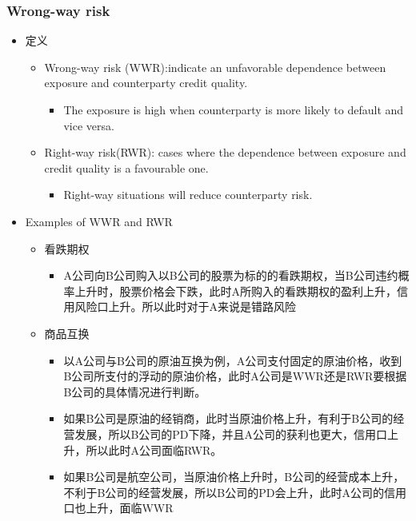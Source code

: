 \subsubsection{Wrong-way risk}
\begin{itemize}
    \item 定义
    \begin{itemize}
        \item Wrong-way risk (WWR):indicate an unfavorable dependence between exposure and counterparty credit quality.
        \begin{itemize}
            \item The exposure is high when counterparty is more likely to default and vice versa.
        \end{itemize}
        
        \item Right-way risk(RWR): cases where the dependence between exposure and credit quality is a favourable one.
        \begin{itemize}
            \item Right-way situations will reduce counterparty risk.
        \end{itemize}
    \end{itemize}
    \item Examples of WWR and RWR
    \begin{itemize}
        \item 看跌期权
        \begin{itemize}
            \item A公司向B公司购入以B公司的股票为标的的看跌期权，当B公司违约概率上升时，股票价格会下跌，此时A所购入的看跌期权的盈利上升，信用风险口上升。所以此时对于A来说是错路风险
        \end{itemize}

        \item 商品互换
        \begin{itemize}
            \item 以A公司与B公司的原油互换为例，A公司支付固定的原油价格，收到B公司所支付的浮动的原油价格，此时A公司是WWR还是RWR要根据B公司的具体情况进行判断。
            \item 如果B公司是原油的经销商，此时当原油价格上升，有利于B公司的经营发展，所以B公司的PD下降，并且A公司的获利也更大，信用口上升，所以此时A公司面临RWR。
            \item 如果B公司是航空公司，当原油价格上升时，B公司的经营成本上升，不利于B公司的经营发展，所以B公司的PD会上升，此时A公司的信用口也上升，面临WWR
        \end{itemize}



\end{itemize}
\end{itemize}
